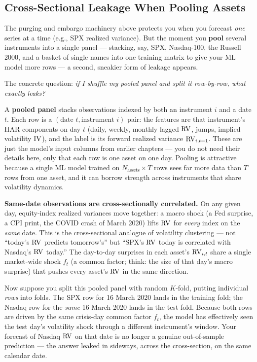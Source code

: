 \subsection{Cross-Sectional Leakage When Pooling Assets}
\label{sec:ch16:xsection-leakage}

The purging and embargo machinery above protects you when you forecast \emph{one} series at a time (e.g., SPX realized variance).
But the moment you \textbf{pool} several instruments into a single panel --- stacking, say, SPX, Nasdaq-100, the Russell 2000, and a basket of single names into one training matrix to give your ML model more rows --- a second, sneakier form of leakage appears.

The concrete question: \emph{if I shuffle my pooled panel and split it row-by-row, what exactly leaks?}

\begin{prereq}
A \textbf{pooled panel} stacks observations indexed by both an instrument $i$ and a date $t$.
Each row is a $(\text{date } t, \text{instrument } i)$ pair: the features are that instrument's HAR components on day $t$ (daily, weekly, monthly lagged $\operatorname{RV}$, jumps, implied volatility $\operatorname{IV}$), and the label is its forward realized variance $\operatorname{RV}_{i,t+1}$.
These are just the model's input columns from earlier chapters --- you do not need their details here, only that each row is one asset on one day.
Pooling is attractive because a single ML model trained on $N_{\text{assets}} \times T$ rows sees far more data than $T$ rows from one asset, and it can borrow strength across instruments that share volatility dynamics.
\end{prereq}

\textbf{Same-date observations are cross-sectionally correlated.}
On any given day, equity-index realized variances move together: a macro shock (a Fed surprise, a CPI print, the COVID crash of March 2020) lifts $\operatorname{RV}$ for \emph{every} index on the \emph{same} date.
This is the cross-sectional analogue of volatility clustering --- not ``today's $\operatorname{RV}$ predicts tomorrow's'' but ``SPX's $\operatorname{RV}$ today is correlated with Nasdaq's $\operatorname{RV}$ today.''
The day-to-day surprises in each asset's $\operatorname{RV}_{i,t}$ share a single market-wide shock $f_t$ (a common factor; think: the size of that day's macro surprise) that pushes every asset's $\operatorname{RV}$ in the same direction.

Now suppose you split this pooled panel with random $K$-fold, putting individual \emph{rows} into folds. The SPX row for 16 March 2020 lands in the training fold; the Nasdaq row for the \emph{same} 16 March 2020 lands in the test fold. Because both rows are driven by the same crisis-day common factor $f_t$, the model has effectively seen the test day's volatility shock through a different instrument's window. Your forecast of Nasdaq $\operatorname{RV}$ on that date is no longer a genuine out-of-sample prediction --- the answer leaked in sideways, across the cross-section, on the same calendar date.

